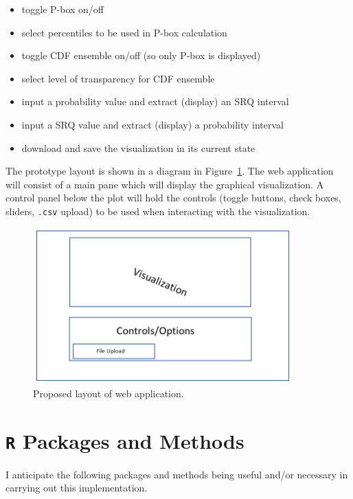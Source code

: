 \documentclass[11pt]{asaproc}\usepackage[]{graphicx}\usepackage[]{color}
\begin{document}
\begin{itemize}
\item toggle P-box on/off
\item select percentiles to be used in P-box calculation
\item toggle CDF ensemble on/off (so only P-box is displayed)
\item select level of transparency for CDF ensemble
\item input a probability value and extract (display) an SRQ interval
\item input a SRQ value and extract (display) a probability interval
\item download and save the visualization in its current state
\end{itemize}

The prototype layout is shown in a diagram in Figure~\ref{AppLayout}. The web application will consist of a main pane which will display the graphical visualization. A control panel below the plot will hold the controls (toggle buttons, check boxes, sliders, {\tt .csv} upload) to be used when interacting with the visualization. 

\begin{figure}[t]
\begin{center} 
\includegraphics[height=6cm,width=10cm]{figures2/app_layout.png}
\end{center} 
\caption{\label{AppLayout}Proposed layout of web application.}
\end{figure}

\section{{\tt R} Packages and Methods}  
\label{Packages}

I anticipate the following packages and methods being useful and/or necessary in carrying out this implementation.
\end{document}
